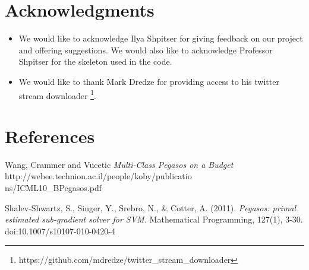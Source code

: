 \documentclass[11pt,letterpaper]{article}
\begin{document}
\section*{Acknowledgments}
\begin{itemize}
\item We would like to acknowledge Ilya Shpitser for giving feedback on our project and offering suggestions. We would also like to acknowledge Professor Shpitser for the skeleton used in the code.
\item We would like to thank Mark Dredze for providing access to his twitter stream downloader \footnote{https://github.com/mdredze/twitter\_stream\_downloader}.
\end{itemize}

\section*{References}
Wang, Crammer and Vucetic \textit{Multi-Class Pegasos on a Budget}
\\http://webee.technion.ac.il/people/koby/publicatio\\ns/ICML10\_BPegasos.pdf

\vspace{1em}

Shalev-Shwartz, S., Singer, Y., Srebro, N., \& Cotter, A. (2011). \textit{Pegasos: primal estimated sub-gradient solver for SVM.} Mathematical Programming, 127(1), 3-30. doi:10.1007/s10107-010-0420-4
\end{document}
